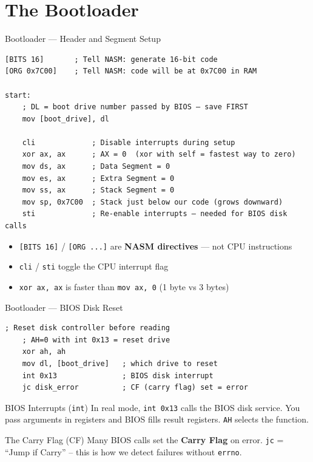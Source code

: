 \documentclass[aspectratio=169]{beamer}
\newcommand{\concept}[2]{%
  \begin{block}{#1}\smallskip #2\smallskip\end{block}\vspace{5pt}}
\begin{document}
\section{The Bootloader}

\begin{frame}[fragile]{Bootloader --- Header and Segment Setup}
  \begin{lstlisting}[style=asm]
[BITS 16]       ; Tell NASM: generate 16-bit code
[ORG 0x7C00]    ; Tell NASM: code will be at 0x7C00 in RAM

start:
    ; DL = boot drive number passed by BIOS — save FIRST
    mov [boot_drive], dl

    cli             ; Disable interrupts during setup
    xor ax, ax      ; AX = 0  (xor with self = fastest way to zero)
    mov ds, ax      ; Data Segment = 0
    mov es, ax      ; Extra Segment = 0
    mov ss, ax      ; Stack Segment = 0
    mov sp, 0x7C00  ; Stack just below our code (grows downward)
    sti             ; Re-enable interrupts — needed for BIOS disk calls
  \end{lstlisting}
  \vspace{2pt}
  \begin{itemize}
    \small
    \item \texttt{[BITS 16]} / \texttt{[ORG ...]} are \textbf{NASM directives} — not CPU instructions
    \item \texttt{cli} / \texttt{sti} toggle the CPU interrupt flag
    \item \texttt{xor ax, ax} is faster than \texttt{mov ax, 0} (1 byte vs 3 bytes)
  \end{itemize}
\end{frame}

\begin{frame}[fragile]{Bootloader --- BIOS Disk Reset}
  \begin{lstlisting}[style=asm]
    ; Reset disk controller before reading
    ; AH=0 with int 0x13 = reset drive
    xor ah, ah
    mov dl, [boot_drive]   ; which drive to reset
    int 0x13               ; BIOS disk interrupt
    jc disk_error          ; CF (carry flag) set = error
  \end{lstlisting}
  \vspace{4pt}
  \concept{BIOS Interrupts (\texttt{int})}{
    In real mode, \texttt{int 0x13} calls the BIOS disk service. You pass arguments in registers and BIOS fills result registers. \texttt{AH} selects the function.
  }
  \vspace{4pt}
  \concept{The Carry Flag (CF)}{
    Many BIOS calls set the \textbf{Carry Flag} on error. \texttt{jc} = ``Jump if Carry'' -- this is how we detect failures without \texttt{errno}.
  }
\end{frame}
\end{document}
